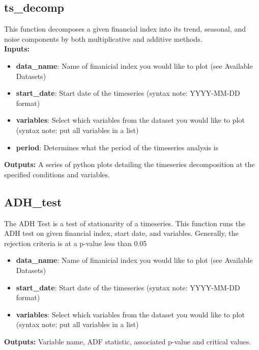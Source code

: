 \documentclass{article}
\begin{document}
\subsection*{ts\_decomp}
This function decomposes a given financial index into its trend, seasonal, and noise components by both multiplicative and additive methods. \\
\textbf{Inputs:}
\begin{itemize}
    \item \textbf{data\_name}: Name of finanicial index you would like to plot (see Available Datasets) 
    \item \textbf{start\_date}: Start date of the timeseries (syntax note:  YYYY-MM-DD format)
    \item \textbf{variables}: Select which variables from the dataset you would like to plot (syntax note: put all variables in a list)
    \item \textbf{period}: Determines what the period of the timeseries analysis is
\end{itemize}
\textbf{Outputs:} A series of python plots detailing the timeseries decomposition at the specified conditions and variables.
\\

\subsection*{ADH\_test}
The ADH Test is a test of stationarity of a timeseries. This function runs the ADH test on given financial index, start date, and variables. 
Generally, the rejection criteria is at a p-value less than 0.05\\
\begin{itemize}
    \item \textbf{data\_name}: Name of finanicial index you would like to plot (see Available Datasets) 
    \item \textbf{start\_date}: Start date of the timeseries (syntax note:  YYYY-MM-DD format)
    \item \textbf{variables}: Select which variables from the dataset you would like to plot (syntax note: put all variables in a list)
\end{itemize}
\textbf{Outputs:} Variable name, ADF statistic, associated p-value and critical values. 
\end{document}
